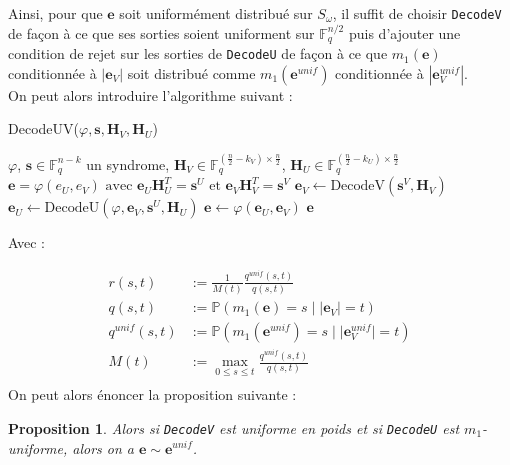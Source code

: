 \documentclass[12pt]{article}
\theoremstyle{plain}
\newtheorem{propo}[thm]{Proposition}
\newcommand{\F}{\mathbb{F}}
\newcommand{\e}{\mathbf{e}}
\newcommand{\s}{\mathbf{s}}
\begin{document}
Ainsi, pour que $\mathbf{e}$ soit uniformément distribué sur $S_\omega$, il suffit de choisir \verb|DecodeV| de façon à ce que ses sorties soient uniforment sur $\F_q^{n/2}$ puis d'ajouter une condition de rejet sur les sorties de \verb|DecodeU| de façon à ce que $m_1(\mathbf{e})$ conditionnée à $|\mathbf{e}_V|$ soit distribué comme $m_1(\mathbf{e}^{unif})$ conditionnée à $|\mathbf{e}_V^{unif}|$. \\
On peut alors introduire l'algorithme suivant :
\begin{algorithm}
	\caption{DecodeUV($\varphi, \s, \mathbf{H}_V, \mathbf{H}_U$)}
	\begin{algorithmic}[1]
   	 	\REQUIRE $\varphi$, $\s \in \F_q^{n-k}$ un syndrome, $\mathbf{H}_V \in \F_q^{(\frac{n}{2} - k_V) \times \frac{n}{2}}$, $\mathbf{H}_U \in \F_q^{(\frac{n}{2} - k_U) \times \frac{n}{2}}$
   	 	\ENSURE $\e = \varphi(e_U, e_V) \text{ avec } \e_U\mathbf{H}_U^T = \s^U \text{ et } \e_V\mathbf{H}_V^T = \s^V$
    	\STATE $\e_V \leftarrow \text {DecodeV}(\s^V,\mathbf{H}_V)$
    	\REPEAT 
    	\STATE $\e_U \leftarrow \text {DecodeU}(\varphi, \e_V, \s^U, \mathbf{H}_U)$
    	\STATE $\e \leftarrow \varphi(\e_U,\e_V)$
    	\UNTIL {$\text{rand}([0,1]) > \mathbf{r}_U(|\e_V|, m_1(\e)$}
    	\RETURN $\e$
    \end{algorithmic}
\end{algorithm}
\noindent Avec :

\begin{equation*}
   \begin{split}
    r(s,t) &:= \frac{1}{M(t)}\frac{q^{unif}(s,t)}{q(s,t)} \\
    q(s,t) &:= \mathbb{P}(m_1(\mathbf{e})=s\;|\;|\mathbf{e}_V|=t)\\[.6cm]
    q^{unif}(s,t) &:= \mathbb{P}(m_1(\mathbf{e}^{unif})=s\;|\;|\mathbf{e}^{unif}_V|=t)\\[.6cm]
    M(t) &:= \max_{0 \leq s \leq t} \frac{q^{unif}(s,t)}{q(s,t)}\\[.6cm]
    \end{split}
\end{equation*}
On peut alors énoncer la proposition suivante :


\begin{propo}
Alors si \verb|DecodeV| est uniforme en poids et si \verb|DecodeU| est $m_1$-uniforme, alors on a $\mathbf{e}\sim\mathbf{e}^{unif}$.
\end{propo}
\end{document}
